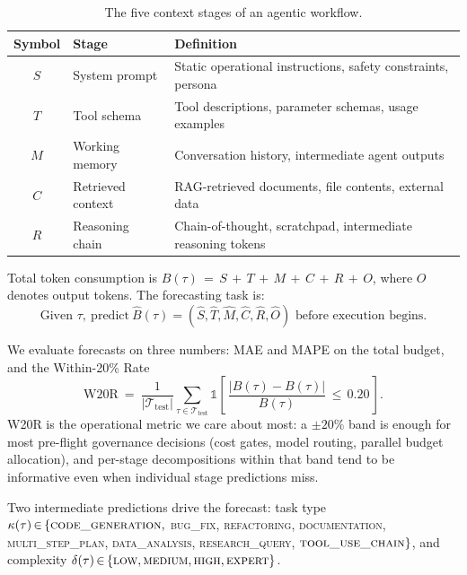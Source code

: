 \documentclass{article}
\begin{document}
\begin{table}[h]
  \caption{The five context stages of an agentic workflow.}
  \label{tab:stages}
  \centering
  \begin{tabular}{cll}
    \toprule
    Symbol & Stage & Definition \\
    \midrule
    $S$ & System prompt & Static operational instructions, safety constraints, persona \\
    $T$ & Tool schema   & Tool descriptions, parameter schemas, usage examples \\
    $M$ & Working memory & Conversation history, intermediate agent outputs \\
    $C$ & Retrieved context & RAG-retrieved documents, file contents, external data \\
    $R$ & Reasoning chain & Chain-of-thought, scratchpad, intermediate reasoning tokens \\
    \bottomrule
  \end{tabular}
\end{table}

Total token consumption is $B(\tau)\,{=}\,S\,{+}\,T\,{+}\,M\,{+}\,C\,{+}\,R\,{+}\,O$,
where $O$ denotes output tokens. The forecasting task is:
\begin{equation}
  \text{Given } \tau,\ \text{predict}\ \hat{B}(\tau)
    = (\hat{S}, \hat{T}, \hat{M}, \hat{C}, \hat{R}, \hat{O})
    \text{ before execution begins.}
\end{equation}

We evaluate forecasts on three numbers: MAE and MAPE on the total budget,
and the Within-20\% Rate
\begin{equation}
  \text{W20R}\ =\ \frac{1}{|\mathcal{T}_{\text{test}}|}
    \sum_{\tau \in \mathcal{T}_{\text{test}}}
    \mathbb{1}\!\left[\,
      \frac{\bigl|\hat{B}(\tau) - B(\tau)\bigr|}{B(\tau)} \,\le\, 0.20
    \,\right].
\end{equation}
W20R is the operational metric we care about most: a $\pm 20\%$ band is
enough for most pre-flight governance decisions (cost gates, model
routing, parallel budget allocation), and per-stage decompositions within
that band tend to be informative even when individual stage predictions
miss.

Two intermediate predictions drive the forecast: task type
$\kappa(\tau)\,{\in}\,\{\textsc{code\_generation},$ \textsc{bug\_fix},
\textsc{refactoring}, \textsc{documentation}, \textsc{multi\_step\_plan},
\textsc{data\_analysis}, \textsc{research\_query},
$\textsc{tool\_use\_chain}\}$, and complexity
$\delta(\tau)\,{\in}\,\{\textsc{low}, \textsc{medium}, \textsc{high},
\textsc{expert}\}$.
\end{document}
